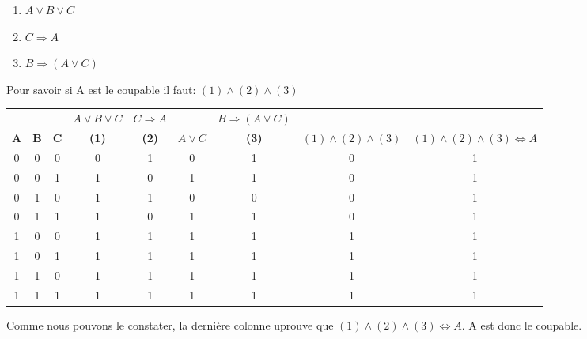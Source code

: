 \documentclass{report}
\begin{document}
  \begin{enumerate}[(1).]
  \item $A \vee B \vee C$
  \item $C \Rightarrow A$
  \item $B \Rightarrow (A \vee C)$
  \end{enumerate}
  Pour savoir si A est le coupable il faut: $(1)\wedge(2)\wedge(3)$


\begin{center}
\begin{tabular}{|ccc||cccc||c||c|}
\hline
&  &  & $A \vee B \vee C$ & $C \Rightarrow A$ &  & $B \Rightarrow (A \vee C)$ &  & \\
\textbf{\textcolor{tcA}{$\textbf{A}$}} & \textbf{\textcolor{tcA}{$\textbf{B}$}} & \textbf{\textcolor{tcA}{$\textbf{C}$}} & \textbf{\textcolor{tcA}{(1)}} & \textbf{\textcolor{tcA}{(2)}} & \textbf{\textcolor{tcA}{$A \vee C$}} & \textbf{\textcolor{tcA}{(3)}} & \textbf{\textcolor{tcA}{$(1)\wedge(2)\wedge(3)$}} & \textbf{\textcolor{tcA}{$(1)\wedge(2)\wedge(3) \Leftrightarrow A $}}\\
\hline
0 & 0 & 0 & 0 & 1 & 0 & 1 & 0 & 1\\
0 & 0 & 1 & 1 & 0 & 1 & 1 & 0 & 1\\
0 & 1 & 0 & 1 & 1 & 0 & 0 & 0 & 1\\
0 & 1 & 1 & 1 & 0 & 1 & 1 & 0 & 1\\
1 & 0 & 0 & 1 & 1 & 1 & 1 & 1 & 1\\
1 & 0 & 1 & 1 & 1 & 1 & 1 & 1 & 1\\
1 & 1 & 0 & 1 & 1 & 1 & 1 & 1 & 1\\
1 & 1 & 1 & 1 & 1 & 1 & 1 & 1 & 1\\
\hline
\end{tabular}
\end{center}

  
Comme nous pouvons le constater, la derni\`{e}re colonne uprouve que $(1)\wedge(2)\wedge(3) \Leftrightarrow A $. A est donc le coupable.
 
 
 
 
\end{document}
